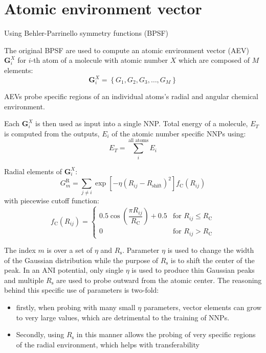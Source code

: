 \section{Atomic environment vector}

Using Behler-Parrinello symmetry functions (BPSF)

The original BPSF are used to compute an atomic environment vector (AEV)
$\mathbf{G}^{X}_{i}$ for $i$-th atom of a molecule with atomic number $X$
which are composed of $M$ elements:
\begin{equation}
\mathbf{G}^{X}_{i} = \left\{
G_{1}, G_{2}, G_{3}, \ldots, G_{M}
\right\}
\end{equation}

AEVs probe specific regions of an individual atoms's radial and angular chemical
environment.

Each $\mathbf{G}^{X}_{i}$ is then used as input into a single NNP.
Total energy of a molecule, $E_{T}$ is computed from the outputs, $E_{i}$
of the atomic number specific NNPs using:
\begin{equation}
E_{T} = \sum_{i}^{\text{all atoms}} E_{i}
\end{equation}

Radial elements of $\mathbf{G}^{X}_{i}$:
\begin{equation}
G^{\mathrm{R}}_{m} = \sum_{j \neq i} \exp\left[ -\eta
  \left( R_{ij} - R_{\mathrm{shift}} \right)^2 \right]
  f_{\mathrm{C}}\left(  R_{ij} \right)
\end{equation}
with piecewise cutoff function:
\begin{equation}
f_{\mathrm{C}}\left(R_{ij}\right) = \begin{cases}
0.5\cos\left( \dfrac{\pi R_{ij}}{R_{\mathrm{C}}} \right) + 0.5 & \text{for }
R_{ij} \leq R_{\mathrm{C}} \\
0 & \text{for } R_{ij} > R_{\mathrm{C}}
\end{cases}
\end{equation}

The index $m$ is over a set of $\eta$ and $R_{\mathrm{s}}$.
Parameter $\eta$ is used to change the width of the Gaussian distribution
while the purpose of $R_{\mathrm{s}}$ is to shift the center of the peak.
In an ANI potential, only single $\eta$ is used to produce thin Gaussian peaks
and multiple $R_{\mathrm{s}}$ are used to probe outward from the atomic center.
The reasoning behind this specific use of
parameters is two-fold:
\begin{itemize}
\item firstly, when probing with many small $\eta$ parameters,
vector elements can grow to very large values,
which are detrimental to the training of NNPs.
\item Secondly, using $R_{\mathrm{s}}$ in this manner allows the
probing of very specific regions of
the radial environment, which helps with transferability
\end{itemize}

